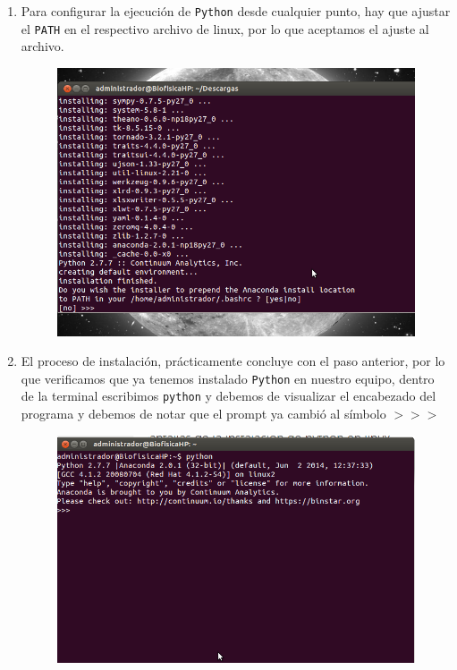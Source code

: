 \documentclass[12pt]{article}
\begin{document}
\begin{enumerate}
\begin{figure}[H]
\end{figure}
\item Para configurar la ejecución de \texttt{Python} desde cualquier punto, hay que ajustar el \texttt{PATH} en el respectivo archivo de linux, por lo que aceptamos el ajuste al archivo.
\begin{figure}[H]
	\centering
	\includegraphics[scale=0.5]{Imagenes/Anaconda_Linux_07.png} 
\end{figure}
\item El proceso de instalación, prácticamente concluye con el paso anterior, por lo que verificamos que ya tenemos instalado \texttt{Python} en nuestro equipo, dentro de la terminal escribimos \texttt{python} y debemos de visualizar el encabezado del programa y debemos de notar que el prompt ya cambió al símbolo $>>>$
\begin{figure}[H]
	\centering
	\includegraphics[scale=0.5]{Imagenes/Anaconda_Linux_08.png} 
\end{figure}
\end{enumerate}
\end{document}

